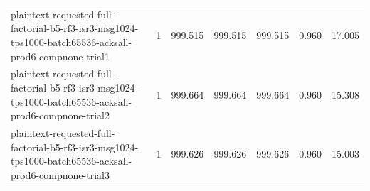 \begin{tabular}{lrrrrrr}
plaintext-requested-full-factorial-b5-rf3-isr3-msg1024-tps1000-batch65536-acksall-prod6-compnone-trial1 & 1 & 999.515 & 999.515 & 999.515 & 0.960 & 17.005 \\
plaintext-requested-full-factorial-b5-rf3-isr3-msg1024-tps1000-batch65536-acksall-prod6-compnone-trial2 & 1 & 999.664 & 999.664 & 999.664 & 0.960 & 15.308 \\
plaintext-requested-full-factorial-b5-rf3-isr3-msg1024-tps1000-batch65536-acksall-prod6-compnone-trial3 & 1 & 999.626 & 999.626 & 999.626 & 0.960 & 15.003 \\
\hline
\end{tabular}
